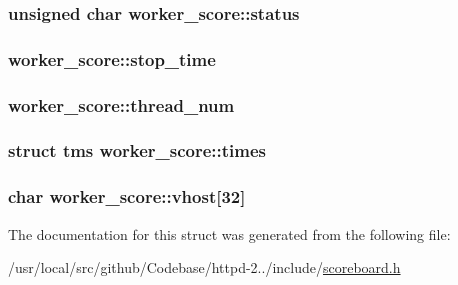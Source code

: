\subsubsection[{\texorpdfstring{status}{status}}]{\setlength{\rightskip}{0pt plus 5cm}unsigned char worker\+\_\+score\+::status}\hypertarget{structworker__score_a00d08351762a2d7d79cfde18a95956fa}{}\label{structworker__score_a00d08351762a2d7d79cfde18a95956fa}
\subsubsection[{\texorpdfstring{stop\+\_\+time}{stop_time}}]{ worker\+\_\+score\+::stop\+\_\+time}\hypertarget{structworker__score_a8b6c244411031439ffb57e6fea8b87ee}{}\label{structworker__score_a8b6c244411031439ffb57e6fea8b87ee}
\subsubsection[{\texorpdfstring{thread\+\_\+num}{thread_num}}]{ worker\+\_\+score\+::thread\+\_\+num}\hypertarget{structworker__score_a51e7bad1b12a4ea7f1d2115a9ba13ac4}{}\label{structworker__score_a51e7bad1b12a4ea7f1d2115a9ba13ac4}
\subsubsection[{\texorpdfstring{times}{times}}]{\setlength{\rightskip}{0pt plus 5cm}struct tms worker\+\_\+score\+::times}\hypertarget{structworker__score_add8155c70a6183a4db2976a1e308aeae}{}\label{structworker__score_add8155c70a6183a4db2976a1e308aeae}
\subsubsection[{\texorpdfstring{vhost}{vhost}}]{\setlength{\rightskip}{0pt plus 5cm}char worker\+\_\+score\+::vhost\mbox{[}32\mbox{]}}\hypertarget{structworker__score_a1c3f78874e38e7c13ac75aefb6a97e2c}{}\label{structworker__score_a1c3f78874e38e7c13ac75aefb6a97e2c}


The documentation for this struct was generated from the following file\+:\begin{DoxyCompactItemize}
\item 
/usr/local/src/github/\+Codebase/httpd-\/2../include/\hyperlink{scoreboard_8h}{scoreboard.\+h}\end{DoxyCompactItemize}

